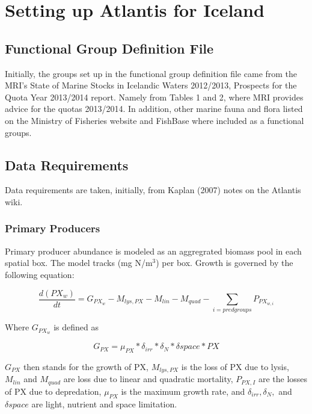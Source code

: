 \documentclass{report}
\begin{document}
\section{Setting up Atlantis for Iceland}

\subsection{Functional Group Definition File}

Initially, the groups set up in the functional group definition file came from the MRI's State of Marine Stocks in Icelandic Waters 2012/2013, Prospects for the Quota Year 2013/2014 report. Namely from Tables 1 and 2, where MRI provides advice for the quotas 2013/2014. In addition, other marine fauna and flora listed on the Ministry of Fisheries website \cite{is_fish} and FishBase \cite{fishdb} where included as a functional groups. 

\subsection{Data Requirements}

Data requirements are taken, initially, from Kaplan (2007) notes on the Atlantis wiki.

\subsubsection{Primary Producers}

Primary producer abundance is modeled as an aggregrated biomass pool in each spatial box. The model tracks (mg N/m$^3$) per box. Growth is governed by the following equation:

\begin{equation}
\frac{d(PX_w)}{dt} = G_{PX_w} - M_{lys,PX} - M_{lin} - M_{quad} - \sum_{i = pred groups}{P_{PX_{w,i}}}
\end{equation}

Where $G_{PX_w}$ is defined as

\begin{equation}
G_{PX} = \mu_{PX} * \delta_{irr} * \delta_{N} * \delta{space} * PX
\end{equation}

$G_{PX}$ then stands for the growth of PX, $M_{lys,PX}$ is the loss of PX due to lysis, $M_{lin}$ and $M_{quad}$ are loss due to linear and quadratic mortality, $P_{PX,I}$ are the losses of PX due to depredation, $\mu_{PX}$ is the maximum growth rate, and $\delta_{irr}, \delta_{N},$ and $\delta{space}$ are light, nutrient and space limitation. 
\end{document}
